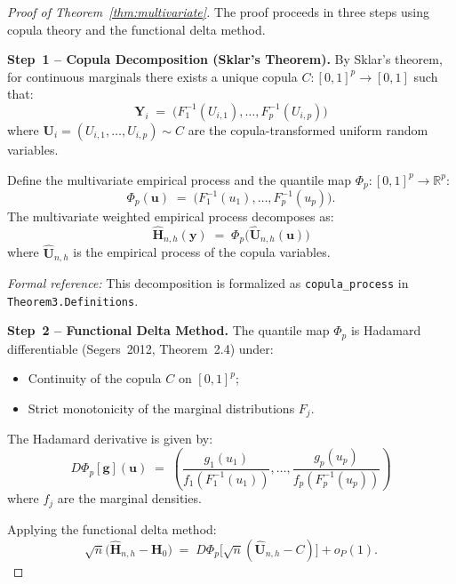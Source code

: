 \begin{proof}[Proof of Theorem~\ref{thm:multivariate}]
The proof proceeds in three steps using copula theory and the functional delta method.

\textbf{Step~1 -- Copula Decomposition (Sklar's Theorem).}
By Sklar's theorem, for continuous marginals there exists a unique copula $C: [0,1]^p \to [0,1]$ such that:
\begin{equation}\label{eq:sklar}
\mathbf{Y}_i \;=\; \big(F_1^{-1}(U_{i,1}), \ldots, F_p^{-1}(U_{i,p})\big)
\end{equation}
where $\mathbf{U}_i = (U_{i,1}, \ldots, U_{i,p}) \sim C$ are the copula-transformed uniform random variables.

Define the multivariate empirical process and the quantile map $\Phi_p: [0,1]^p \to \mathbb{R}^p$:
\[
\Phi_p(\mathbf{u}) \;=\; \big(F_1^{-1}(u_1), \ldots, F_p^{-1}(u_p)\big).
\]
The multivariate weighted empirical process decomposes as:
\begin{equation}
\widehat{\mathbf{H}}_{n,h}(\mathbf{y}) \;=\; \Phi_p\big(\widehat{\mathbf{U}}_{n,h}(\mathbf{u})\big)
\end{equation}
where $\widehat{\mathbf{U}}_{n,h}$ is the empirical process of the copula variables.

\textit{Formal reference:} This decomposition is formalized as \texttt{copula\_process} in \texttt{Theorem3.Definitions}.

\textbf{Step~2 -- Functional Delta Method.}
The quantile map $\Phi_p$ is Hadamard differentiable (Segers~2012, Theorem~2.4) under:
\begin{itemize}
\item Continuity of the copula $C$ on $[0,1]^p$;
\item Strict monotonicity of the marginal distributions $F_j$.
\end{itemize}
The Hadamard derivative is given by:
\begin{equation}
D\Phi_p[\mathbf{g}](\mathbf{u}) \;=\; \left(\frac{g_1(u_1)}{f_1(F_1^{-1}(u_1))}, \ldots, \frac{g_p(u_p)}{f_p(F_p^{-1}(u_p))}\right)
\end{equation}
where $f_j$ are the marginal densities.

Applying the functional delta method:
\begin{equation}\label{eq:delta-method}
\sqrt{n}\big(\widehat{\mathbf{H}}_{n,h} - \mathbf{H}_0\big)
\;=\; D\Phi_p\big[\sqrt{n}(\widehat{\mathbf{U}}_{n,h} - C)\big] + o_P(1).
\end{equation}


\end{proof}
